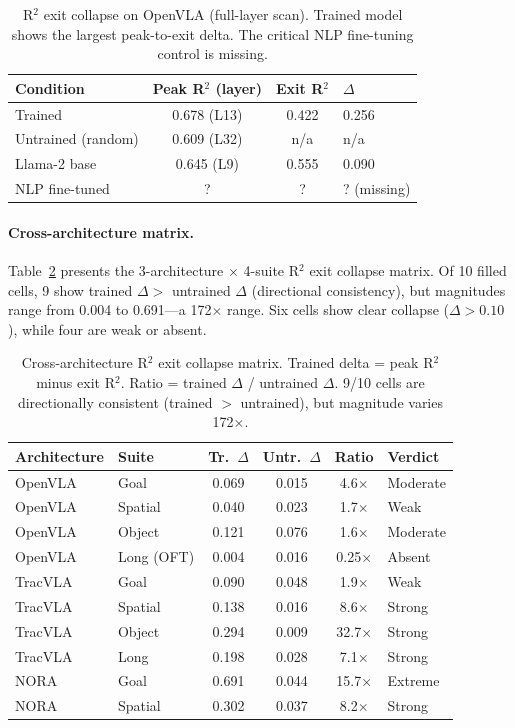 \documentclass[letterpaper]{article}
\begin{document}
\begin{table}[t]
\centering
\caption{R$^2$ exit collapse on OpenVLA (full-layer scan). Trained model shows the largest peak-to-exit delta. The critical NLP fine-tuning control is missing.}
\label{tab:r2exit}
\small
\begin{tabular}{lccl}
\toprule
\textbf{Condition} & \textbf{Peak R$^2$ (layer)} & \textbf{Exit R$^2$} & \textbf{$\Delta$} \\
\midrule
Trained & 0.678 (L13) & 0.422 & 0.256 \\
Untrained (random) & 0.609 (L32) & n/a & n/a \\
Llama-2 base & 0.645 (L9) & 0.555 & 0.090 \\
NLP fine-tuned & ? & ? & ? (missing) \\
\bottomrule
\end{tabular}
\end{table}

\paragraph{Cross-architecture matrix.}
Table~\ref{tab:matrix} presents the 3-architecture $\times$ 4-suite R$^2$ exit collapse matrix.
Of 10 filled cells, 9 show trained $\Delta >$ untrained $\Delta$ (directional consistency), but magnitudes range from 0.004 to 0.691---a 172$\times$ range.
Six cells show clear collapse ($\Delta > 0.10$), while four are weak or absent.

\begin{table}[t]
\centering
\caption{Cross-architecture R$^2$ exit collapse matrix. Trained delta = peak R$^2$ minus exit R$^2$. Ratio = trained $\Delta$ / untrained $\Delta$. 9/10 cells are directionally consistent (trained $>$ untrained), but magnitude varies 172$\times$.}
\label{tab:matrix}
\small
\setlength{\tabcolsep}{3pt}
\begin{tabular}{llcccl}
\toprule
\textbf{Architecture} & \textbf{Suite} & \textbf{Tr.\ $\Delta$} & \textbf{Untr.\ $\Delta$} & \textbf{Ratio} & \textbf{Verdict} \\
\midrule
OpenVLA & Goal & 0.069 & 0.015 & 4.6$\times$ & Moderate \\
OpenVLA & Spatial & 0.040 & 0.023 & 1.7$\times$ & Weak \\
OpenVLA & Object & 0.121 & 0.076 & 1.6$\times$ & Moderate \\
OpenVLA & Long (OFT) & 0.004 & 0.016 & 0.25$\times$ & Absent \\
\midrule
TracVLA & Goal & 0.090 & 0.048 & 1.9$\times$ & Weak \\
TracVLA & Spatial & 0.138 & 0.016 & 8.6$\times$ & Strong \\
TracVLA & Object & 0.294 & 0.009 & 32.7$\times$ & Strong \\
TracVLA & Long & 0.198 & 0.028 & 7.1$\times$ & Strong \\
\midrule
NORA & Goal & 0.691 & 0.044 & 15.7$\times$ & Extreme \\
NORA & Spatial & 0.302 & 0.037 & 8.2$\times$ & Strong \\
\bottomrule
\end{tabular}
\end{table}
\end{document}
